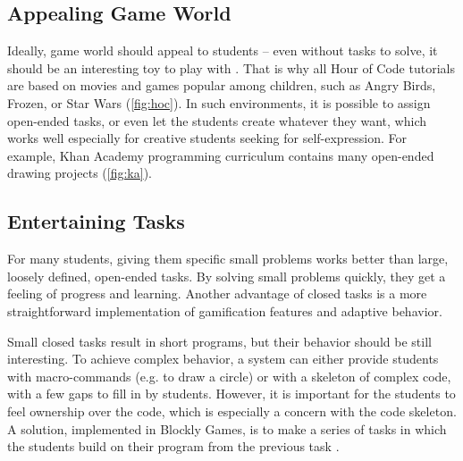\subsection{Appealing Game World}
\label{sec:motivation.game-world}
Ideally, game world should appeal to students --
even without tasks to solve,
  it should be an interesting toy to play with \cite{book-of-lenses}.
That is why all Hour of Code tutorials are based on movies and games
  popular among children, such as Angry Birds, Frozen, or Star Wars
  (\cref{fig:hoc}).
In such environments, it is possible to assign open-ended tasks,
  or even let the students create whatever they want,
  which works well especially for creative students seeking for self-expression.
For example, Khan Academy programming curriculum contains many
open-ended drawing projects (\cref{fig:ka}).

\subsection{Entertaining Tasks}
\label{sec:motivation.tasks}
For many students, giving them specific small problems works better
  than large, loosely defined, open-ended tasks.
By solving small problems quickly,
  they get a feeling of progress and learning.
Another advantage of closed tasks
  is a more straightforward implementation of gamification features and adaptive behavior.

Small closed tasks result in short programs,
  but their behavior should be still interesting. %
To achieve complex behavior,
  a system can either provide students with macro-commands (e.g. to draw a circle)
  or with a skeleton of complex code, with a few gaps to fill in by students.
However, it is important for the students to feel ownership over the code,
  which is especially a concern with the code skeleton.
A solution, implemented in Blockly Games,
  is to make a series of tasks in which the students
  build on their program from the previous task
  \cite{blockly-10-things}.



